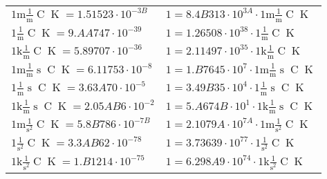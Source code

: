 \begin{center}
\begin{longtable}{l l}
{\color{gray}$1 \bm{\mathrm{ m}}\frac1{\operatorname{m}}{}{\operatorname{C}}{\operatorname{K}} = 1.51523\cdot10^{-3B} $}   & {\color{gray}$ 1 = 8.4B313\cdot10^{3A} \cdot 1 \bm{\mathrm{ m}}\frac1{\operatorname{m}}{}{\operatorname{C}}{\operatorname{K}}$}  \\
{\color{black}$1 \bm{\mathrm{ }}\frac1{\operatorname{m}}{}{\operatorname{C}}{\operatorname{K}} = 9.AA747\cdot10^{-39} $}   & {\color{black}$ 1 = 1.26508\cdot10^{38} \cdot 1 \bm{\mathrm{ }}\frac1{\operatorname{m}}{}{\operatorname{C}}{\operatorname{K}}$}  \\
{\color{gray}$1 \bm{\mathrm{ k}}\frac1{\operatorname{m}}{}{\operatorname{C}}{\operatorname{K}} = 5.89707\cdot10^{-36} $}   & {\color{gray}$ 1 = 2.11497\cdot10^{35} \cdot 1 \bm{\mathrm{ k}}\frac1{\operatorname{m}}{}{\operatorname{C}}{\operatorname{K}}$}  \\
{\color{gray}$1 \bm{\mathrm{ m}}\frac1{\operatorname{m}}{\operatorname{s}}{\operatorname{C}}{\operatorname{K}} = 6.11753\cdot10^{-8} $}   & {\color{gray}$ 1 = 1.B7645\cdot10^{7} \cdot 1 \bm{\mathrm{ m}}\frac1{\operatorname{m}}{\operatorname{s}}{\operatorname{C}}{\operatorname{K}}$}  \\
{\color{black}$1 \bm{\mathrm{ }}\frac1{\operatorname{m}}{\operatorname{s}}{\operatorname{C}}{\operatorname{K}} = 3.63A70\cdot10^{-5} $}   & {\color{black}$ 1 = 3.49B35\cdot10^{4} \cdot 1 \bm{\mathrm{ }}\frac1{\operatorname{m}}{\operatorname{s}}{\operatorname{C}}{\operatorname{K}}$}  \\
{\color{gray}$1 \bm{\mathrm{ k}}\frac1{\operatorname{m}}{\operatorname{s}}{\operatorname{C}}{\operatorname{K}} = 2.05AB6\cdot10^{-2} $}   & {\color{gray}$ 1 = 5.A674B\cdot10^{1} \cdot 1 \bm{\mathrm{ k}}\frac1{\operatorname{m}}{\operatorname{s}}{\operatorname{C}}{\operatorname{K}}$}  \\
{\color{gray}$1 \bm{\mathrm{ m}}{}\frac1{\operatorname{s}^2}{\operatorname{C}}{\operatorname{K}} = 5.8B786\cdot10^{-7B} $}   & {\color{gray}$ 1 = 2.1079A\cdot10^{7A} \cdot 1 \bm{\mathrm{ m}}{}\frac1{\operatorname{s}^2}{\operatorname{C}}{\operatorname{K}}$}  \\
{\color{black}$1 \bm{\mathrm{ }}{}\frac1{\operatorname{s}^2}{\operatorname{C}}{\operatorname{K}} = 3.3AB62\cdot10^{-78} $}   & {\color{black}$ 1 = 3.73639\cdot10^{77} \cdot 1 \bm{\mathrm{ }}{}\frac1{\operatorname{s}^2}{\operatorname{C}}{\operatorname{K}}$}  \\
{\color{gray}$1 \bm{\mathrm{ k}}{}\frac1{\operatorname{s}^2}{\operatorname{C}}{\operatorname{K}} = 1.B1214\cdot10^{-75} $}   & {\color{gray}$ 1 = 6.298A9\cdot10^{74} \cdot 1 \bm{\mathrm{ k}}{}\frac1{\operatorname{s}^2}{\operatorname{C}}{\operatorname{K}}$}  \\

\end{longtable}
\end{center}

